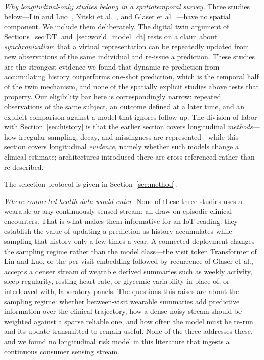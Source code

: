 \documentclass[journal]{IEEEtran}
\begin{document}
\emph{Why longitudinal-only studies belong in a spatiotemporal survey.} Three studies below---Lin and Luo~\cite{lin2022deep}, Nitski et al.~\cite{nitski2021long}, and Glaser et al.~\cite{glaser2022deep}---have no spatial component. We include them deliberately. The digital twin argument of Sections~\ref{sec:DT} and~\ref{sec:world_model_dt} rests on a claim about \emph{synchronization}: that a virtual representation can be repeatedly updated from new observations of the same individual and re-issue a prediction. These studies are the strongest evidence we found that dynamic re-prediction from accumulating history outperforms one-shot prediction, which is the temporal half of the twin mechanism, and none of the spatially explicit studies above tests that property. Our eligibility bar here is correspondingly narrow: repeated observations of the same subject, an outcome defined at a later time, and an explicit comparison against a model that ignores follow-up. The division of labor with Section~\ref{sec:history} is that the earlier section covers longitudinal \emph{methods}---how irregular sampling, decay, and missingness are represented---while this section covers longitudinal \emph{evidence}, namely whether such models change a clinical estimate; architectures introduced there are cross-referenced rather than re-described.

The selection protocol is given in Section~\ref{sec:method}.

\emph{Where connected health data would enter.} None of these three studies uses a wearable or any continuously sensed stream; all draw on episodic clinical encounters. That is what makes them informative for an IoT reading: they establish the value of updating a prediction as history accumulates while sampling that history only a few times a year. A connected deployment changes the sampling regime rather than the model class---the visit token Transformer of Lin and Luo, or the per-visit embedding followed by recurrence of Glaser et al., accepts a denser stream of wearable derived summaries such as weekly activity, sleep regularity, resting heart rate, or glycemic variability in place of, or interleaved with, laboratory panels. The questions this raises are about the sampling regime: whether between-visit wearable summaries add predictive information over the clinical trajectory, how a dense noisy stream should be weighted against a sparse reliable one, and how often the model must be re-run and its update transmitted to remain useful. None of the three addresses these, and we found no longitudinal risk model in this literature that ingests a continuous consumer sensing stream.
\end{document}

